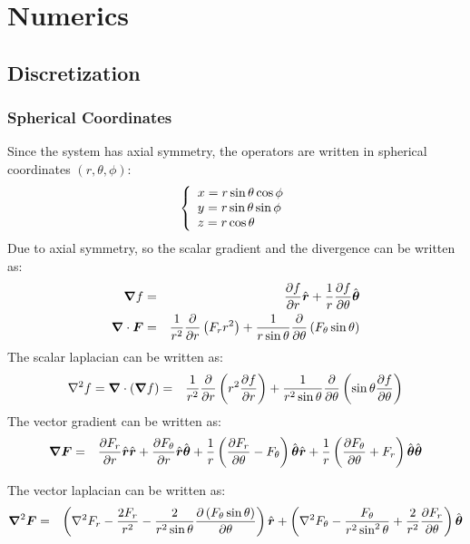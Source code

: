 \section{Numerics}


\subsection{Discretization}
\subsubsection{Spherical Coordinates}
Since the system has axial symmetry, the operators are written in 
spherical coordinates $(r,\theta,\phi)$:
\begin{eqnarray}
\brc{l}{
x = r \sin \theta \cos \phi \\
y = r \sin \theta \sin \phi \\
z = r \cos \theta} 
\end{eqnarray}
Due to axial symmetry, 
so the scalar gradient and the divergence can be written as:
\begin{eqnarray}
\bnabla f &=& \deriv{f}{r}\brhat + \frac{1}{r}\deriv{f}{\theta}\bthetahat \\
\bnabla \cdot \bF &=& \frac{1}{r^2}\deriv{}{r}\pars{F_r r^2 } + 
               \frac{1}{r \sin\theta}\deriv{}{\theta}\pars{F_\theta \sin\theta}
\end{eqnarray}
The scalar laplacian can be written as:
\begin{eqnarray}
\Laplacian f = \bnabla \cdot (\bnabla f)&=& 
 \frac{1}{r^2}\deriv{}{r}\pars{r^2 \deriv{f}{r}} + 
 \frac{1}{r^2 \sin\theta}\deriv{}{\theta}\pars{\sin\theta \deriv{f}{\theta}}
\end{eqnarray}
The vector gradient can be written as:
\begin{eqnarray}
\bnabla \bF &=& \deriv{F_r}{r} \brhat \brhat + \deriv{F_\theta}{r} \brhat \bthetahat + 
\frac{1}{r}\pars{\deriv{F_r}{\theta} - F_\theta} \bthetahat \brhat + 
\frac{1}{r}\pars{\deriv{F_\theta}{\theta} + F_r} \bthetahat \bthetahat
\end{eqnarray}

The vector laplacian can be written as:
\begin{eqnarray}
\bLaplacian \bF &=& 
\left(\Laplacian F_r - \frac{2F_r}{r^2} - 
\frac{2}{r^2 \sin\theta} \deriv{\left(F_\theta \sin\theta \right)}{\theta}\right)\brhat
+ \left(\Laplacian F_\theta - \frac{F_\theta}{r^2 \sin^2\theta} + 
\frac{2}{r^2}\deriv{F_r}{\theta}\right) \bthetahat
\end{eqnarray}

